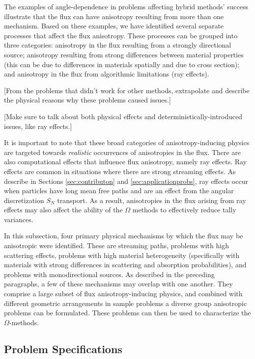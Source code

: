 The examples of angle-dependence in problems affecting hybrid methods' success
illustrate that the flux can have anisotropy resulting from more than one
mechanism. Based on these examples, we have identified several separate
processes that affect the flux anisotropy. These processes can be grouped into
three categories: anisotropy in the flux resulting from a strongly
directional source; anisotropy resulting from strong differences between
material properties (this can be due to differences in
materials spatially and due to cross section); and anisotropy in the flux
from algorithmic limitations (ray effects).

[From the problems that didn't work for other methods, extrapolate and describe
the physical reasons why these problems caused issues.]

[Make sure to talk about both physical effects and deterministically-introduced
issues, like ray effects.]

It is important to note that these broad categories of anisotropy-inducing
physics are targeted towards \textit{realistic} occurrences of anisotropies in
the flux. There are also computational effects that influence flux anisotropy,
namely ray effects. Ray effects are common in situations where there are strong
streaming effects. As describe in Sections \ref{sec:contributon} and
\ref{sec:applicationprobs}, ray effects occur when particles have long mean free
paths and are an effect from the angular discretization $S_N$ transport. As a
result, anisotropies in the flux arising from ray effects may also affect the
ability of the $\Omega$ methods to effectively reduce tally variances.

In this subsection, four primary physical mechanisms by which the flux may
be anisotropic were identified. These are streaming paths, problems with high
scattering effects, problems with high material heterogeneity (specifically with
materials with strong differences in scattering and absorption probabilities),
and problems with monodirectional sources. As described in the preceding
paragraphs, a few of these mechanisms may overlap
with one another. They comprise a large subset of flux
anisotropy-inducing physics, and combined with different geometric arrangements
in sample problems a diverse group anisotropic problems can be formulated. These
problems can then be used to characterize the $\Omega$-methods.

\subsection{Problem Specifications}
\label{subsec:ProbSpecs}

